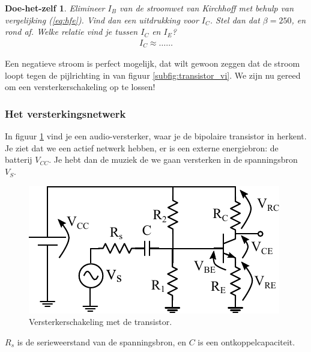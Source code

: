 \documentclass{article}
\newtheorem{DIY}{Doe-het-zelf}
\begin{document}
				\begin{DIY} Elimineer $I_B$ van de stroomwet van Kirchhoff met behulp van vergelijking (\ref{eq:hfe}). Vind dan een uitdrukking voor $I_C$. Stel dan dat $\beta = 250$, en rond af. Welke relatie vind je tussen $I_C$ en $I_E$? 
				\begin{align*}
				    I_C \approx \ldots \ldots
				\end{align*}
				\end{DIY}
				Een negatieve stroom is perfect mogelijk, dat wilt gewoon zeggen dat de stroom loopt tegen de pijlrichting in van figuur \ref{subfig:transistor_vi}. We zijn nu gereed om een versterkerschakeling op te lossen!

			\subsubsection{Het versterkingsnetwerk}
				In figuur \ref{fig:ges} vind je een audio-versterker, waar je de bipolaire transistor in herkent. Je ziet dat we een actief netwerk hebben, er is een externe energiebron: de batterij $V_{CC}$. Je hebt dan de muziek de we gaan versterken in de spanningsbron $V_S$.

				\begin{figure}[htbp]
					\centering
					\includegraphics{ges}
					\caption{Versterkerschakeling met de transistor.}
					\label{fig:ges}
				\end{figure}

				$R_s$ is de serieweerstand van de spanningsbron, en $C$ is een ontkoppelcapaciteit.

\end{document}
